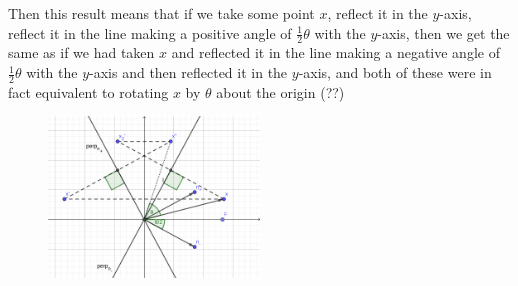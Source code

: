 \documentclass[fleqn,a4paper,11pt]{article}
\begin{document}
\begin{enumerate}[label=\textbf{\arabic*.}]
\begin{enumerate}[label=(\alph*)]
      Then this result means that if we take some point \(x\), reflect it in the
      \(y\)-axis, reflect it in the line
      making a positive angle of \(\tfrac 12 \theta\) with the \(y\)-axis, then
      we get the same as if we had taken \(x\) and
      reflected it in the line making a negative angle of
      \(\frac 12 \theta\) with the \(y\)-axis and then reflected it in the
      \(y\)-axis, and both of these were in fact equivalent to rotating
      \(x\) by \(\theta\) about the origin (??)
      \begin{figure}[H]
       \begin{center}
       \includegraphics[width=0.5\textwidth]{12_c.png}
       \end{center}
      \end{figure}
    \end{enumerate}
 \end{enumerate}
\end{document}
